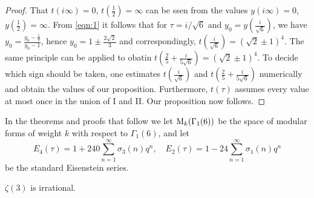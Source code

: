 \begin{proof}
That $t(i \infty) = 0$, $t(\frac{1}{2}) = \infty$ can be ssen from the values $y(i\infty) = 0$, $y(\frac{1}{2}) = \infty$.
From \eqref{eqn:1} it follows that for $\tau = i/\sqrt{6}$ and $y_0 = y(\frac{i}{\sqrt{6}})$, we have $y_0 = \frac{y_0 - \frac{1}{9}}{y_0 - 1}$, hence $y_0 = 1 \pm \frac{2 \sqrt{2}}{3}$ and correspondingly, $t(\frac{i}{\sqrt{6}}) = (\sqrt{2} \pm 1)^4$.
The same principle can be applied to obatin $t(\frac{2}{5} + \frac{i}{5\sqrt{6}}) = (\sqrt{2} \pm 1)^4$.
To decide which sign should be taken, one estimates $t(\frac{i}{\sqrt{6}})$ and $t(\frac{2}{5} + \frac{i}{5\sqrt{6}})$ numerically and obtain the values of our proposition.
Furthermore, $t(\tau)$ assumes every value at most once in the union of I and II.
Our proposition now follows.
\end{proof}

In the theorems and proofs that follow we let $\mathrm{M}_k(\Gamma_1(6))$ be the space of modular forms of weight $k$ with respect to $\Gamma_1(6)$, and let
$$
    E_4 (\tau) = 1 + 240 \sum_{n=1}^{\infty} \sigma_3(n) q^n, \quad E_2(\tau) = 1 - 24 \sum_{n=1}^{\infty} \sigma_1(n) q^n 
$$
be the standard Eisenstein series.

\begin{theorem}
    \label{thm:1}
    $\zeta(3)$ is irrational.
\end{theorem}

